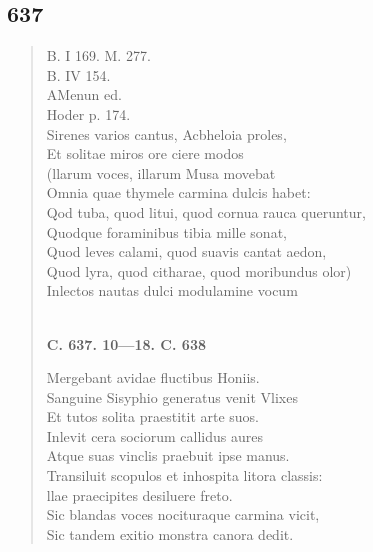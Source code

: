 \documentclass[11pt, a4paper]{report}
\begin{document}
            \subsection*{637}
      \begin{verse}
      B. I 169. M. 277. \\ B. IV 154. \\ AMenun ed. \\ Hoder p. 174. \\ Sirenes varios cantus, Acbheloia proles, \\ Et solitae miros ore ciere modos \\ (llarum voces, illarum Musa movebat \\ Omnia quae thymele carmina dulcis habet: \\ Qod tuba, quod litui, quod cornua rauca queruntur, \\ Quodque foraminibus tibia mille sonat, \\ Quod leves calami, quod suavis cantat aedon, \\ Quod lyra, quod citharae, quod moribundus olor) \\ Inlectos nautas dulci modulamine vocum \\ 
        ﻿\pagebreak 
     \marginpar{[104]} \begin{center} \textbf{C. 637. 10—18. C. 638} \end{center}Mergebant avidae fluctibus Honiis. \\ Sanguine Sisyphio generatus venit Vlixes \\ Et tutos solita praestitit arte suos. \\ Inlevit cera sociorum callidus aures \\ Atque suas vinclis praebuit ipse manus. \\ Transiluit scopulos et inhospita litora classis: \\ llae praecipites desiluere freto. \\ Sic blandas voces nocituraque carmina vicit, \\ Sic tandem exitio monstra canora dedit. \\ 
      \end{verse}
  
\end{document}
